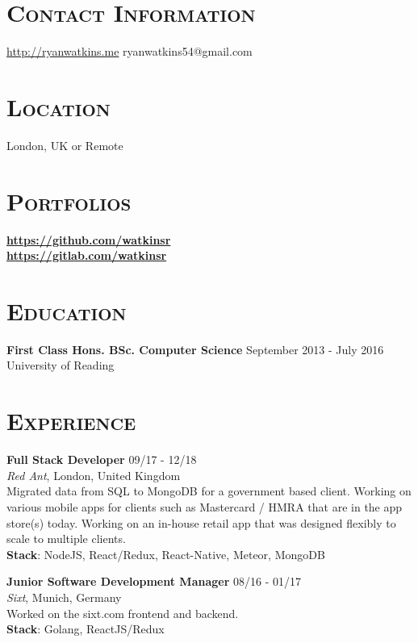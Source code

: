 \documentclass[line, margin, 10pt]{res}
\begin{document}
\renewcommand{\namefont}{ \LARGE \bf }


\begin{resume}

\section{\textsc{Contact Information}}
\url{http://ryanwatkins.me} \hfill {ryanwatkins54@gmail.com}\\

\section{\textsc{Location}}
London, UK or Remote

\section{\textsc{Portfolios}}
        {\bf \url{https://github.com/watkinsr}}\\
        {\hfill {\bf \url{https://gitlab.com/watkinsr}}}
        
\section{\textsc{Education}}
        
{\bf First Class Hons. BSc. Computer Science}  {\hfill September 2013 - July 2016}\\
University of Reading

\section{\textsc{Experience}}
{\bf Full Stack Developer} {\hfill 09/17 - 12/18}\\
{\it Red Ant}, London, United Kingdom \\
Migrated data from SQL to MongoDB for a government based client. Working on various mobile apps for clients such as Mastercard / HMRA that are in the app store(s) today. Working on an in-house retail app that was designed flexibly to scale to multiple clients.\\
{\bf Stack}: NodeJS, React/Redux, React-Native, Meteor, MongoDB

{\bf Junior Software Development Manager} {\hfill 08/16 - 01/17}\\
{\it Sixt}, Munich, Germany\\
Worked on the sixt.com frontend and backend.\\
{\bf Stack}: Golang, ReactJS/Redux


\end{resume}
\end{document}
